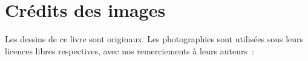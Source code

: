 \chapter*{Crédits des images}

\begingroup\sloppy

Les dessins de ce livre sont originaux. Les photographies sont
utilisées sous leurs licences libres respectives, avec nos
remerciements à leurs auteurs~:

